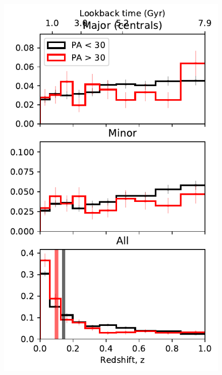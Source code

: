 \documentclass[fleqn,usenatbib]{mnras}
\begin{document}
\begin{figure}
	\includegraphics[width=\linewidth]{tng_results/time_since_last_merger_centrals_PA_split.pdf}
    \caption{}
    \label{fig:last_merger_cen}
\end{figure}
\end{document}
